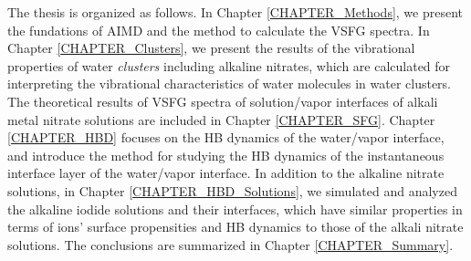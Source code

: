 The thesis is organized as follows. 
In Chapter \ref{CHAPTER_Methods}, we present the fundations of AIMD 
and the method to calculate the VSFG spectra.
In Chapter \ref{CHAPTER_Clusters}, we present the results of the vibrational properties of water \emph{clusters} including alkaline nitrates, 
which are calculated for interpreting the vibrational characteristics of water molecules in water clusters.
The theoretical results of VSFG spectra of solution/vapor interfaces of alkali metal nitrate solutions are included in Chapter \ref{CHAPTER_SFG}. 
Chapter \ref{CHAPTER_HBD} focuses on the HB dynamics of the water/vapor interface, 
and introduce the method for studying the HB dynamics of the instantaneous interface layer of the water/vapor interface.
In addition to the alkaline nitrate solutions, in Chapter \ref{CHAPTER_HBD_Solutions}, we simulated and analyzed the alkaline iodide solutions 
and their interfaces, which have similar properties in terms of ions' surface propensities and HB dynamics to those of the alkali nitrate solutions. 
The conclusions are summarized in Chapter \ref{CHAPTER_Summary}.
